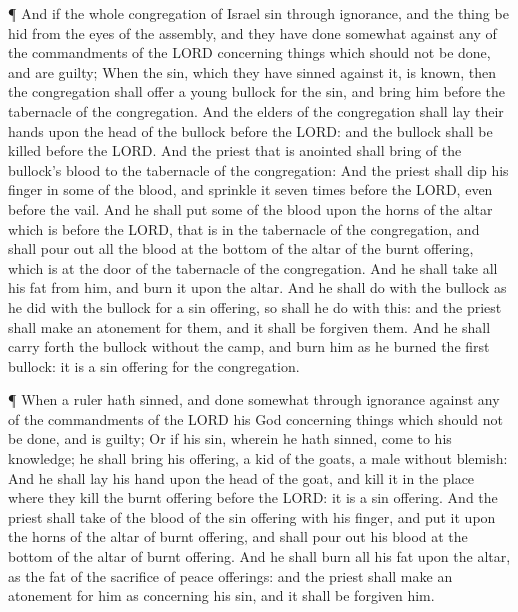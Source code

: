  ¶ And if the whole congregation of Israel sin through
ignorance, and the thing be hid from the eyes of the assembly, and they
have done somewhat against any of the commandments of the LORD
concerning things which should not be done, and are guilty;
 When the sin, which they have sinned against it, is known,
then the congregation shall offer a young bullock for the sin, and bring
him before the tabernacle of the congregation.  And the
elders of the congregation shall lay their hands upon the head of the
bullock before the LORD: and the bullock shall be killed before the
LORD.  And the priest that is anointed shall bring of the
bullock's blood to the tabernacle of the congregation:  And
the priest shall dip his finger in some of the blood, and sprinkle it
seven times before the LORD, even before the vail.  And he
shall put some of the blood upon the horns of the altar which is before
the LORD, that is in the tabernacle of the congregation, and shall pour
out all the blood at the bottom of the altar of the burnt offering,
which is at the door of the tabernacle of the congregation.
 And he shall take all his fat from him, and burn it upon
the altar.  And he shall do with the bullock as he did with
the bullock for a sin offering, so shall he do with this: and the priest
shall make an atonement for them, and it shall be forgiven them.
 And he shall carry forth the bullock without the camp, and
burn him as he burned the first bullock: it is a sin offering for the
congregation.

 ¶ When a ruler hath sinned, and done somewhat through
ignorance against any of the commandments of the LORD his God concerning
things which should not be done, and is guilty;  Or if his
sin, wherein he hath sinned, come to his knowledge; he shall bring his
offering, a kid of the goats, a male without blemish:  And
he shall lay his hand upon the head of the goat, and kill it in the
place where they kill the burnt offering before the LORD: it is a sin
offering.  And the priest shall take of the blood of the
sin offering with his finger, and put it upon the horns of the altar of
burnt offering, and shall pour out his blood at the bottom of the altar
of burnt offering.  And he shall burn all his fat upon the
altar, as the fat of the sacrifice of peace offerings: and the priest
shall make an atonement for him as concerning his sin, and it shall be
forgiven him.

